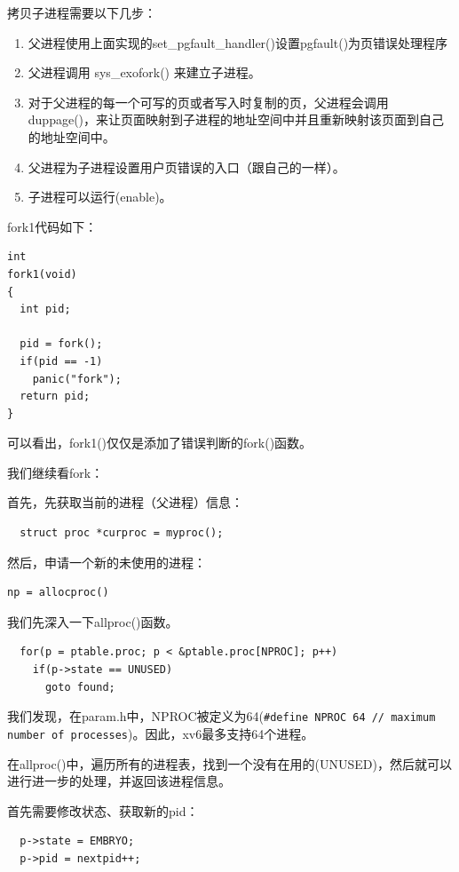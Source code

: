拷贝子进程需要以下几步：

\begin{enumerate}
\item 父进程使用上面实现的set\_pgfault\_handler()设置pgfault()为页错误处理程序
\item 父进程调用 sys\_exofork() 来建立子进程。
\item 对于父进程的每一个可写的页或者写入时复制的页，父进程会调用 duppage()，来让页面映射到子进程的地址空间中并且重新映射该页面到自己的地址空间中。
\item 父进程为子进程设置用户页错误的入口（跟自己的一样）。
\item 子进程可以运行(enable)。
\end{enumerate}

fork1代码如下：

\begin{verbatim}
int
fork1(void)
{
  int pid;

  pid = fork();
  if(pid == -1)
    panic("fork");
  return pid;
}
\end{verbatim}

可以看出，fork1()仅仅是添加了错误判断的fork()函数。

我们继续看fork：

首先，先获取当前的进程（父进程）信息：

\begin{verbatim}
  struct proc *curproc = myproc();
\end{verbatim}

然后，申请一个新的未使用的进程：

\begin{verbatim}
np = allocproc()
\end{verbatim}

我们先深入一下allproc()函数。

\begin{verbatim}
  for(p = ptable.proc; p < &ptable.proc[NPROC]; p++)
    if(p->state == UNUSED)
      goto found;
\end{verbatim}

我们发现，在param.h中，NPROC被定义为64(\texttt{#define NPROC        64  // maximum number of processes})。因此，xv6最多支持64个进程。

在allproc()中，遍历所有的进程表，找到一个没有在用的(UNUSED)，然后就可以进行进一步的处理，并返回该进程信息。

首先需要修改状态、获取新的pid：

\begin{verbatim}
  p->state = EMBRYO;
  p->pid = nextpid++;
\end{verbatim}

